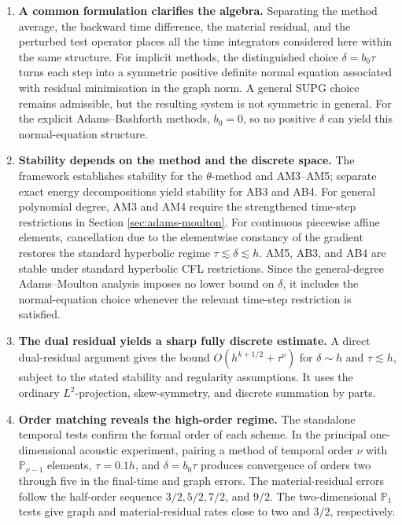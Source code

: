 \documentclass[11pt]{article}
\begin{document}
\begin{enumerate}[label=\arabic*.,leftmargin=*,itemsep=0.65em,topsep=0.5em]
\item \textbf{A common formulation clarifies the algebra.}
Separating the method average, the backward time difference, the material
residual, and the perturbed test operator places all the time integrators
considered here within the same structure. For implicit methods, the
distinguished choice \(\delta=b_0\tau\) turns each step into a symmetric
positive definite normal equation associated with residual minimisation in
the graph norm. A general SUPG choice remains admissible, but the resulting
system is not symmetric in general. For the explicit Adams--Bashforth
methods, \(b_0=0\), so no positive \(\delta\) can yield this normal-equation
structure.

\item \textbf{Stability depends on the method and the discrete space.}
The framework establishes stability for the \(\theta\)-method and AM3--AM5;
separate exact energy decompositions yield stability for AB3 and AB4. For
general polynomial degree, AM3 and AM4 require the strengthened time-step
restrictions in Section \ref{sec:adams-moulton}. For continuous piecewise
affine elements, cancellation due to the elementwise constancy of the
gradient restores the standard hyperbolic regime
\(\tau\lesssim\delta\lesssim h\). AM5, AB3, and AB4 are stable under standard
hyperbolic CFL restrictions. Since the general-degree Adams--Moulton analysis
imposes no lower bound on \(\delta\), it includes the normal-equation choice
whenever the relevant time-step restriction is satisfied.

\item \textbf{The dual residual yields a sharp fully discrete estimate.}
A direct dual-residual argument gives the bound
\(O(h^{k+1/2}+\tau^\nu)\) for \(\delta\sim h\) and \(\tau\lesssim h\), subject
to the stated stability and regularity assumptions. It uses the ordinary
\(L^2\)-projection, skew-symmetry, and discrete summation by parts.

\item \textbf{Order matching reveals the high-order regime.}
The standalone temporal tests confirm the formal order of each scheme. In the
principal one-dimensional acoustic experiment, pairing a method of temporal
order \(\nu\) with \(\mathbb P_{\nu-1}\) elements, \(\tau=0.1h\), and
\(\delta=b_0\tau\) produces convergence of orders two through five in the
final-time and graph errors. The material-residual errors follow the
half-order sequence \(3/2,5/2,7/2\), and \(9/2\). The two-dimensional
\(\mathbb P_1\) tests give graph and material-residual rates close to two and
\(3/2\), respectively.


\end{enumerate}
\end{document}
